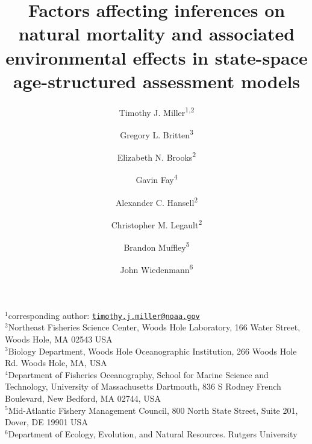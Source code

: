 \documentclass[
  12pt,
]{article}
\title{Factors affecting inferences on natural mortality and associated environmental effects in state-space age-structured assessment models}
\author{Timothy J. Miller\textsuperscript{1,2} \and Gregory L. Britten\textsuperscript{3} \and Elizabeth N. Brooks\textsuperscript{2} \and Gavin Fay\textsuperscript{4} \and Alexander C. Hansell\textsuperscript{2} \and Christopher M. Legault\textsuperscript{2} \and Brandon Muffley\textsuperscript{5} \and John Wiedenmann\textsuperscript{6}}
\date{\DIFdelbegin \DIFdel{18 June, 2025}\DIFdelend \DIFaddbegin \DIFadd{31 March, 2026}\DIFaddend }
\providecommand{\DIFadd}[1]{{\protect\color{blue}\uwave{#1}}} %
\providecommand{\DIFaddbegin}{} %
\providecommand{\DIFaddend}{} %
\providecommand{\DIFdelbegin}{} %
\providecommand{\DIFdelend}{} %
\providecommand{\DIFscaledelfig}{0.5}
\newlength{\DIFdelgraphicswidth} %
\newlength{\DIFdelgraphicsheight} %
\providecommand{\DIFaddincludegraphics}[2][]{{\color{blue}\fbox{\DIFOincludegraphics[#1]{#2}}}} %
\providecommand{\DIFdelincludegraphics}[2][]{%
\sbox{\DIFdelgraphicsbox}{\DIFOincludegraphics[#1]{#2}}%
\settoboxwidth{\DIFdelgraphicswidth}{\DIFdelgraphicsbox} %
\settoboxtotalheight{\DIFdelgraphicsheight}{\DIFdelgraphicsbox} %
\scalebox{\DIFscaledelfig}{%
\parbox[b]{\DIFdelgraphicswidth}{\usebox{\DIFdelgraphicsbox}\\[-\baselineskip] \rule{\DIFdelgraphicswidth}{0em}}\llap{\resizebox{\DIFdelgraphicswidth}{\DIFdelgraphicsheight}{%
\setlength{\unitlength}{\DIFdelgraphicswidth}%
\begin{picture}(1,1)%
\thicklines\linethickness{2pt} %
{\color[rgb]{1,0,0}\put(0,0){\framebox(1,1){}}}%
{\color[rgb]{1,0,0}\put(0,0){\line( 1,1){1}}}%
{\color[rgb]{1,0,0}\put(0,1){\line(1,-1){1}}}%
\end{picture}%
}\hspace*{3pt}}} %
} %
\DeclareRobustCommand{\DIFaddbegin}{\DIFOaddbegin \let\includegraphics\DIFaddincludegraphics} %
\DeclareRobustCommand{\DIFaddend}{\DIFOaddend \let\includegraphics\DIFOincludegraphics} %
\DeclareRobustCommand{\DIFdelbegin}{\DIFOdelbegin \let\includegraphics\DIFdelincludegraphics} %
\DeclareRobustCommand{\DIFdelend}{\DIFOaddend \let\includegraphics\DIFOincludegraphics} %
\begin{document}
\maketitle

\(^1\)corresponding author: \href{mailto:timothy.j.miller@noaa.gov}{\nolinkurl{timothy.j.miller@noaa.gov}}\\
\(^2\)Northeast Fisheries Science Center, Woods Hole Laboratory, 166 Water Street, Woods Hole, MA 02543 USA\\
\(^3\)Biology Department, Woods Hole Oceanographic Institution, 266 Woods Hole Rd. Woods Hole, MA, USA\\
\(^4\)Department of Fisheries Oceanography, School for Marine Science and Technology, University of Massachusetts Dartmouth, 836 S Rodney French Boulevard, New Bedford, MA 02744, USA\\
\(^5\)Mid-Atlantic Fishery Management Council, 800 North State Street, Suite 201, Dover, DE 19901 USA\\
\(^6\)Department of Ecology, Evolution, and Natural Resources. Rutgers University\\

\pagebreak

\DIFdelbegin %
\DIFdelend \DIFaddbegin \subsection*{\DIFadd{Abstract}}\label{abstract}
\DIFaddend {}
\end{document}
